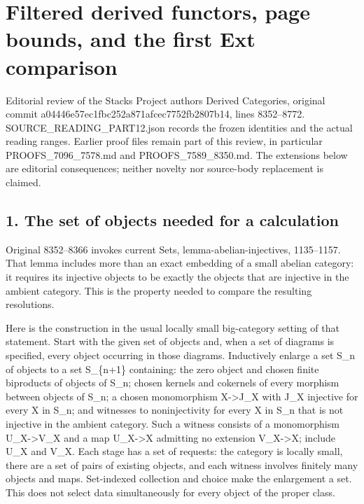\section{\texorpdfstring{Filtered derived functors,\allowbreak{} page bounds,\allowbreak{} and the first Ext comparison}{Filtered derived  page  and the first Ext comparison}}\label{proofs-8352-8772-filtered-derived-functors-page-bounds-and-the-first-ext-comparison}

Editorial review of the Stacks Project authors\textquotesingle{} Derived Categories,\allowbreak{} original commit a04446e5\allowbreak{}7ec1fbc2\allowbreak{}52a871af\allowbreak{}cec7752f\allowbreak{}b2807b14, lines 8352–\allowbreak{}8772. SOURCE\_\allowbreak{}READING\_\allowbreak{}PART12.json records the frozen identities and the actual reading ranges. Earlier proof files remain part of this review,\allowbreak{} in particular PROOFS\_\allowbreak{}7096\_\allowbreak{}7578.md and PROOFS\_\allowbreak{}7589\_\allowbreak{}8350.md. The extensions below are editorial consequences; neither novelty nor source-body replacement is claimed.

\subsection{1. The set of objects needed for a calculation}\label{proofs-8352-8772-the-set-of-objects-needed-for-a-calculation}

Original 8352–\allowbreak{}8366 invokes current Sets,\allowbreak{} lemma-abelian-injectives,\allowbreak{} 1135–\allowbreak{}1157. That lemma includes more than an exact embedding of a small abelian category:\allowbreak{} it requires its injective objects to be exactly the objects that are injective in the ambient category. This is the property needed to compare the resulting resolutions.

Here is the construction in the usual locally small big-category setting of that statement. Start with the given set of objects and,\allowbreak{} when a set of diagrams is specified,\allowbreak{} every object occurring in those diagrams. Inductively enlarge a set S\_\allowbreak{}n of objects to a set S\_\allowbreak{}\{n\allowbreak{}+1\} containing:\allowbreak{} the zero object and chosen finite biproducts of objects of S\_\allowbreak{}n; chosen kernels and cokernels of every morphism between objects of S\_\allowbreak{}n; a chosen monomorphism X\allowbreak{}->J\_\allowbreak{}X with J\_\allowbreak{}X injective for every X in S\_\allowbreak{}n; and witnesses to noninjectivity for every X in S\_\allowbreak{}n that is not injective in the ambient category. Such a witness consists of a monomorphism U\_\allowbreak{}X\allowbreak{}->V\_\allowbreak{}X and a map U\_\allowbreak{}X\allowbreak{}->X admitting no extension V\_\allowbreak{}X\allowbreak{}->X; include U\_\allowbreak{}X and V\_\allowbreak{}X. Each stage has a set of requests:\allowbreak{} the category is locally small,\allowbreak{} there are a set of pairs of existing objects,\allowbreak{} and each witness involves finitely many objects and maps. Set-indexed collection and choice make the enlargement a set. This does not select data simultaneously for every object of the proper class.

